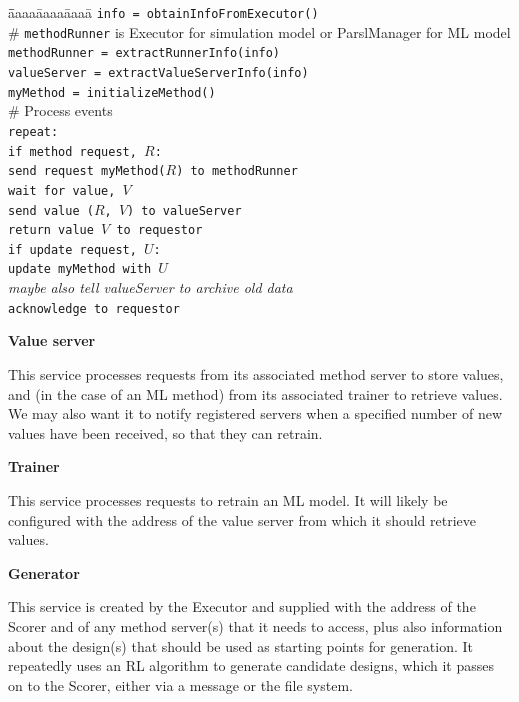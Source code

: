 \documentclass[10pt]{article}
\begin{document}
\begin{tabbing}
\=\=aaaa\=aaaa\=aaaa\=\kill
\>\> \texttt{info = obtainInfoFromExecutor()}\\
\>\> \# \texttt{methodRunner} is Executor for simulation model or ParslManager for ML model\\
\>\> \texttt{methodRunner = extractRunnerInfo(info)}\\ 
\>\> \texttt{valueServer = extractValueServerInfo(info)}\\
\>\> \texttt{myMethod = initializeMethod()}\\
\>\>\# Process events\\
\>\> \texttt{repeat:}\\
\>\>\> \texttt{if method request, $R$:} \\
\>\>\>\> \texttt{send request myMethod($R$) to methodRunner}\\
\>\>\>\> \texttt{wait for value, $V$}\\
\>\>\>\> \texttt{send value ($R$, $V$) to valueServer} \\
\>\>\>\> \texttt{return value $V$ to requestor}\\
\>\>\> \texttt{if update request, $U$:} \\
\>\>\>\> \texttt{update myMethod with $U$}\\
\>\>\>\> \emph{maybe also tell valueServer to archive old data}\\
\>\>\>\> \texttt{acknowledge to requestor}
\end{tabbing}

\vspace{3ex}
\noindent
\textbf{Value server}

\noindent
This service processes requests from its associated method server to store values,
and (in the case of an ML method) from its associated trainer to retrieve values.
We may also want it to notify registered servers when a specified number of new values have been received, so that they can retrain.

\vspace{3ex}
\noindent
\textbf{Trainer}

\noindent
This service processes requests to retrain an ML model.
It will likely be configured with the address of the value server from which it should retrieve values.

\vspace{3ex}
\noindent
\textbf{Generator}

\noindent
This service is created by the Executor and supplied with the address of the 
Scorer and of any method server(s) that it needs to access, plus also information
about the design(s) that should be used as starting points for generation.
It repeatedly uses an RL algorithm to generate candidate designs,
which it passes on to the Scorer, either via a message or the file system.
\end{document}
